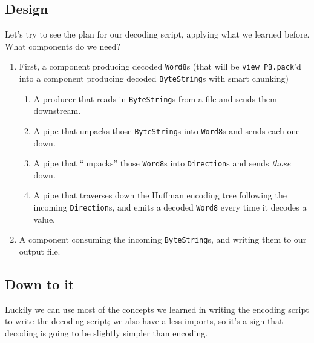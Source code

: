 \documentclass[]{article}
\begin{document}
\subsection{Design}\label{design-1}

Let's try to see the plan for our decoding script, applying what we learned
before. What components do we need?

\begin{enumerate}
\def\labelenumi{\arabic{enumi}.}
\tightlist
\item
  First, a component producing decoded \texttt{Word8}s (that will be
  \texttt{view\ PB.pack}'d into a component producing decoded
  \texttt{ByteString}s with smart chunking)

  \begin{enumerate}
  \def\labelenumii{\arabic{enumii}.}
  \tightlist
  \item
    A producer that reads in \texttt{ByteString}s from a file and sends them
    downstream.
  \item
    A pipe that unpacks those \texttt{ByteString}s into \texttt{Word8}s and
    sends each one down.
  \item
    A pipe that ``unpacks'' those \texttt{Word8}s into \texttt{Direction}s and
    sends \emph{those} down.
  \item
    A pipe that traverses down the Huffman encoding tree following the incoming
    \texttt{Direction}s, and emits a decoded \texttt{Word8} every time it
    decodes a value.
  \end{enumerate}
\item
  A component consuming the incoming \texttt{ByteString}s, and writing them to
  our output file.
\end{enumerate}

\subsection{Down to it}\label{down-to-it-1}

Luckily we can use most of the concepts we learned in writing the encoding
script to write the decoding script; we also have a less imports, so it's a sign
that decoding is going to be slightly simpler than encoding.
\end{document}
